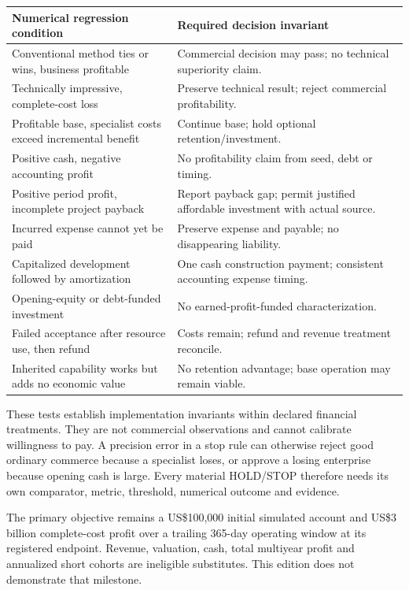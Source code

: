 \documentclass[10pt,a4paper]{article}
\begin{document}
\begin{longtable}{p{.39\linewidth}p{.53\linewidth}}
\toprule
Numerical regression condition & Required decision invariant\\
\midrule
\endhead
Conventional method ties or wins, business profitable & Commercial decision may pass; no technical superiority claim.\\
Technically impressive, complete-cost loss & Preserve technical result; reject commercial profitability.\\
Profitable base, specialist costs exceed incremental benefit & Continue base; hold optional retention/investment.\\
Positive cash, negative accounting profit & No profitability claim from seed, debt or timing.\\
Positive period profit, incomplete project payback & Report payback gap; permit justified affordable investment with actual source.\\
Incurred expense cannot yet be paid & Preserve expense and payable; no disappearing liability.\\
Capitalized development followed by amortization & One cash construction payment; consistent accounting expense timing.\\
Opening-equity or debt-funded investment & No earned-profit-funded characterization.\\
Failed acceptance after resource use, then refund & Costs remain; refund and revenue treatment reconcile.\\
Inherited capability works but adds no economic value & No retention advantage; base operation may remain viable.\\
\bottomrule
\end{longtable}

\RegressionResults{}

These tests establish implementation invariants within declared financial treatments. They are not commercial observations and cannot calibrate willingness to pay. A precision error in a stop rule can otherwise reject good ordinary commerce because a specialist loses, or approve a losing enterprise because opening cash is large. Every material HOLD/STOP therefore needs its own comparator, metric, threshold, numerical outcome and evidence.

The primary objective remains a US\$100,000 initial simulated account and US\$3 billion complete-cost profit over a trailing 365-day operating window at its registered endpoint. Revenue, valuation, cash, total multiyear profit and annualized short cohorts are ineligible substitutes. This edition does not demonstrate that milestone.
\newpage
\end{document}
